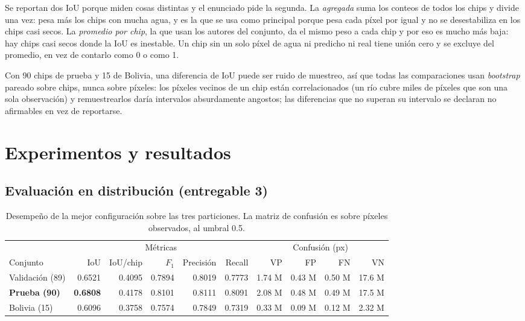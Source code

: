 \documentclass{article}
\begin{document}
Se reportan dos IoU porque miden cosas distintas y el enunciado pide la
segunda. La \emph{agregada} suma los conteos de todos los chips y divide una vez:
pesa más los chips con mucha agua, y es la que se usa como principal porque pesa
cada píxel por igual y no se desestabiliza en los chips casi secos. La
\emph{promedio por chip}, la que usan los
autores del conjunto, da el mismo peso a cada chip y por eso es mucho más baja:
hay chips casi secos donde la IoU es inestable. Un chip sin un solo píxel de agua
ni predicho ni real tiene unión cero y se excluye del promedio, en vez de
contarlo como 0 o como 1.

Con 90 chips de prueba y 15 de Bolivia, una diferencia de IoU puede ser ruido de
muestreo, así que todas las comparaciones usan \emph{bootstrap}
\citep{efron1994bootstrap} pareado sobre chips, nunca sobre
píxeles: los píxeles vecinos de un chip están correlacionados (un río cubre
miles de píxeles que son una sola observación) y remuestrearlos daría
intervalos absurdamente angostos; las diferencias que no superan su intervalo se
declaran no afirmables en vez de reportarse.

\section{Experimentos y resultados}

\subsection{Evaluación en distribución (entregable 3)}

\begin{table}[!htbp]
\centering
\caption{Desempeño de la mejor configuración sobre las tres particiones. La
matriz de confusión es sobre píxeles observados, al umbral 0.5.}
\label{tab:distribucion}
\small
\begin{tabular}{lrrrrr@{\qquad}rrrr}
\toprule
& \multicolumn{5}{c}{Métricas} & \multicolumn{4}{c}{Confusión (px)} \\
\cmidrule(lr){2-6}\cmidrule(lr){7-10}
Conjunto & IoU & IoU/chip & $F_1$ & Precisión & Recall & VP & FP & FN & VN \\
\midrule
Validación (89) & 0.6521 & 0.4095 & 0.7894 & 0.8019 & 0.7773 & 1.74 M & 0.43 M & 0.50 M & 17.6 M \\
\textbf{Prueba (90)} & \textbf{0.6808} & 0.4178 & 0.8101 & 0.8111 & 0.8091 & 2.08 M & 0.48 M & 0.49 M & 17.5 M \\
Bolivia (15) & 0.6096 & 0.3758 & 0.7574 & 0.7849 & 0.7319 & 0.33 M & 0.09 M & 0.12 M & 2.32 M \\
\bottomrule
\end{tabular}
\end{table}
\end{document}
